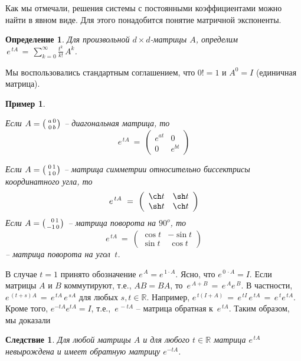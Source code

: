 \documentclass[12pt,a4paper]{article}
\newtheorem{cor}{Следствие}
\newtheorem{ex}{Пример}
\newtheorem{defi}{Определение}
\newcommand{\re}{{\mathbb R}}
\begin{document}
 Как мы отмечали, решения системы с постоянными коэффициентами можно найти в явном виде. Для этого понадобится понятие матричной экспоненты.
 \begin{defi}\label{d.exp}
 Для произвольной $d\times d$-матрицы $A$, определим $\, e^{\,tA} \, = \, \sum_{k=0}^{\infty} \frac{t^k}{k!}\, A^k$.
 \end{defi}
Мы воспользовались стандартным соглашением, что $0! = 1$ и $A^0 = I$ (единичная матрица).
\begin{ex}\label{ex.matr-exp}
{\em Если $A = \bigl({ \, a \, 0 \atop \, 0 \, b} \bigr)$ -- диагональная матрица, то
$$
e^{\, tA} \ = \ \left(
\begin{array}{ll}
  e^{at} &  0 \\
   0 &  e^{bt}
\end{array}
\right)
$$
\smallskip

Если $A = \bigl({ \, 0 \, 1 \atop \, 1 \, 0} \bigr)$ -- матрица симметрии относительно биссектрисы
координатного угла, то
$$
e^{\, tA} \ = \ \left(
\begin{array}{ll}
  \ch t &  \sh t \\
   \sh t &  \ch t
\end{array}
\right)
$$
Если $A = \bigl({ \ \,  0 \, 1 \atop - 1 \, 0} \bigr)$ -- матрица поворота на $90^o$, то
$$
e^{\, tA} \ = \ \left(
\begin{array}{ll}
  \cos t  &  - \sin t  \\
    \sin t  &  \ \cos t
  \end{array}
\right)
$$
-- матрица поворота на угол~$t$.
}
\end{ex}

В случае $t = 1$ принято обозначение $e^{\, A} = e^{\, 1 \cdot  A}$. Ясно, что $e^{\, 0 \, \cdot A} = I$.
Если матрицы $A$ и $B$ коммутируют, т.е., $AB = BA$, то $\, e^{\, A + B} \, = \, e^{\, A} e^{\, B}$.
В частности, $e^{\, (t+s)A} \, = \, e^{\, tA}\, e^{\, sA}$ для любых $s, t \in \re$. Например,
$e^{\, t(I+A)} \, = \, e^{\, tI} \, e^{\, tA} \, = \, e^{\, t} e^{\, tA}$. Кроме того,
$e^{-tA} e^{tA} = I$, т.е., $\, e^{\, -tA}$ -- матрица обратная к $\, e^{\, tA}$. Таким образом, мы доказали
\begin{cor}\label{c.lin-exp2}
Для любой матрицы $A$ и для любого $t \in \re$ матрица $e^{\, tA}$ невырождена и имеет  обратную матрицу
$e^{-tA}$.
\end{cor}
\smallskip
\end{document}
